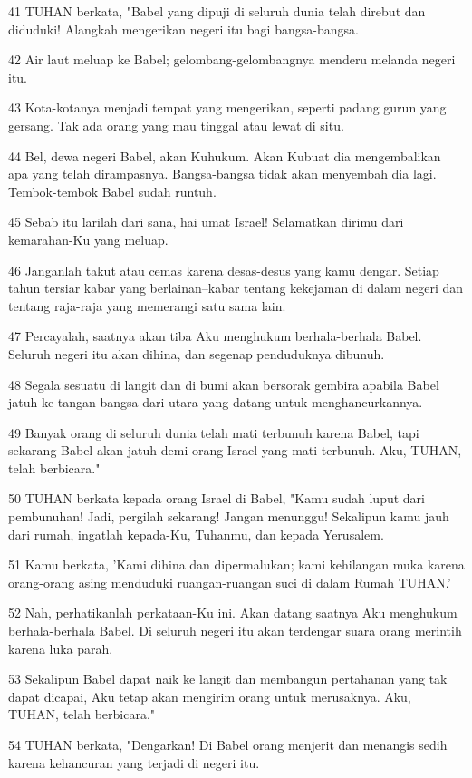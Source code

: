 \par 41 TUHAN berkata, "Babel yang dipuji di seluruh dunia telah direbut dan diduduki! Alangkah mengerikan negeri itu bagi bangsa-bangsa.
\par 42 Air laut meluap ke Babel; gelombang-gelombangnya menderu melanda negeri itu.
\par 43 Kota-kotanya menjadi tempat yang mengerikan, seperti padang gurun yang gersang. Tak ada orang yang mau tinggal atau lewat di situ.
\par 44 Bel, dewa negeri Babel, akan Kuhukum. Akan Kubuat dia mengembalikan apa yang telah dirampasnya. Bangsa-bangsa tidak akan menyembah dia lagi. Tembok-tembok Babel sudah runtuh.
\par 45 Sebab itu larilah dari sana, hai umat Israel! Selamatkan dirimu dari kemarahan-Ku yang meluap.
\par 46 Janganlah takut atau cemas karena desas-desus yang kamu dengar. Setiap tahun tersiar kabar yang berlainan--kabar tentang kekejaman di dalam negeri dan tentang raja-raja yang memerangi satu sama lain.
\par 47 Percayalah, saatnya akan tiba Aku menghukum berhala-berhala Babel. Seluruh negeri itu akan dihina, dan segenap penduduknya dibunuh.
\par 48 Segala sesuatu di langit dan di bumi akan bersorak gembira apabila Babel jatuh ke tangan bangsa dari utara yang datang untuk menghancurkannya.
\par 49 Banyak orang di seluruh dunia telah mati terbunuh karena Babel, tapi sekarang Babel akan jatuh demi orang Israel yang mati terbunuh. Aku, TUHAN, telah berbicara."
\par 50 TUHAN berkata kepada orang Israel di Babel, "Kamu sudah luput dari pembunuhan! Jadi, pergilah sekarang! Jangan menunggu! Sekalipun kamu jauh dari rumah, ingatlah kepada-Ku, Tuhanmu, dan kepada Yerusalem.
\par 51 Kamu berkata, 'Kami dihina dan dipermalukan; kami kehilangan muka karena orang-orang asing menduduki ruangan-ruangan suci di dalam Rumah TUHAN.'
\par 52 Nah, perhatikanlah perkataan-Ku ini. Akan datang saatnya Aku menghukum berhala-berhala Babel. Di seluruh negeri itu akan terdengar suara orang merintih karena luka parah.
\par 53 Sekalipun Babel dapat naik ke langit dan membangun pertahanan yang tak dapat dicapai, Aku tetap akan mengirim orang untuk merusaknya. Aku, TUHAN, telah berbicara."
\par 54 TUHAN berkata, "Dengarkan! Di Babel orang menjerit dan menangis sedih karena kehancuran yang terjadi di negeri itu.
